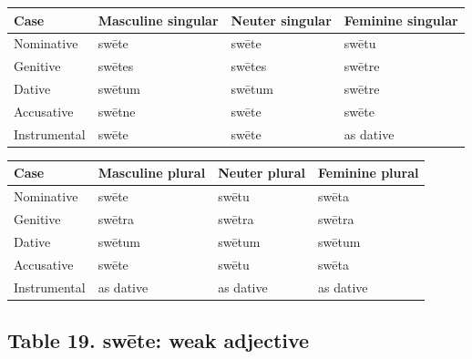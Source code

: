 \par\begingroup
\fontsize{10.5}{13.2}\selectfont
\setlength{\LTleft}{0pt}\setlength{\LTright}{\fill}
\noindent
\begin{tabular}{@{}>{\raggedright\arraybackslash}p{22.0mm}>{\raggedright\arraybackslash}p{31.188mm}>{\raggedright\arraybackslash}p{31.188mm}>{\raggedright\arraybackslash}p{31.188mm}@{}}
\toprule
\textbf{Case} & \textbf{Masculine singular} & \textbf{Neuter singular} & \textbf{Feminine singular} \\
\midrule
Nominative & swēte & swēte & swētu \\
Genitive & swētes & swētes & swētre \\
Dative & swētum & swētum & swētre \\
Accusative & swētne & swēte & swēte \\
Instrumental & swēte & swēte & as dative \\
\bottomrule
\end{tabular}
\par\endgroup
\par\addvspace{5pt}
\par\begingroup
\fontsize{10.5}{13.2}\selectfont
\setlength{\LTleft}{0pt}\setlength{\LTright}{\fill}
\noindent
\begin{tabular}{@{}>{\raggedright\arraybackslash}p{22.0mm}>{\raggedright\arraybackslash}p{31.188mm}>{\raggedright\arraybackslash}p{31.188mm}>{\raggedright\arraybackslash}p{31.188mm}@{}}
\toprule
\textbf{Case} & \textbf{Masculine plural} & \textbf{Neuter plural} & \textbf{Feminine plural} \\
\midrule
Nominative & swēte & swētu & swēta \\
Genitive & swētra & swētra & swētra \\
Dative & swētum & swētum & swētum \\
Accusative & swēte & swētu & swēta \\
Instrumental & as dative & as dative & as dative \\
\bottomrule
\end{tabular}
\par\endgroup

\subsection*{Table 19. swēte: weak adjective}

